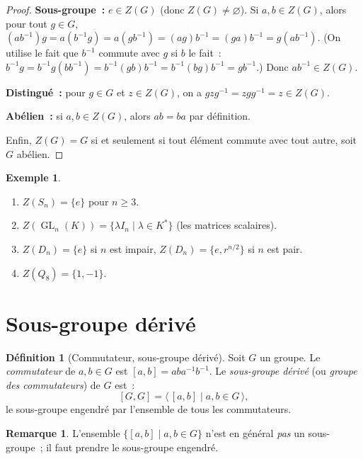 \documentclass[12pt,a4paper,openany]{book}
\theoremstyle{definition}
\newtheorem{definition}{Définition}[chapter]
\newtheorem{remarque}{Remarque}[chapter]
\newtheorem{exemple}{Exemple}[chapter]
\DeclareMathOperator{\GL}{GL}
\newcommand{\gen}[1]{\langle #1 \rangle}
\begin{document}
\begin{proof}
\textbf{Sous-groupe~:} $e \in Z(G)$ (donc $Z(G) \neq \varnothing$). Si $a, b \in Z(G)$,
alors pour tout $g \in G$, $(ab^{-1})g = a(b^{-1}g) = a(gb^{-1}) = (ag)b^{-1} =
(ga)b^{-1} = g(ab^{-1})$. (On utilise le fait que $b^{-1}$ commute avec $g$ si $b$ le
fait~: $b^{-1}g = b^{-1}g(bb^{-1}) = b^{-1}(gb)b^{-1} = b^{-1}(bg)b^{-1} =
gb^{-1}$.) Donc $ab^{-1} \in Z(G)$.

\textbf{Distingué~:} pour $g \in G$ et $z \in Z(G)$, on a $gzg^{-1} = zgg^{-1} = z \in
Z(G)$.

\textbf{Abélien~:} si $a, b \in Z(G)$, alors $ab = ba$ par définition.

Enfin, $Z(G) = G$ si et seulement si tout élément commute avec tout autre, soit $G$
abélien.
\end{proof}

\begin{exemple}
\label{ex:centres}
\begin{enumerate}[label=(\roman*)]
  \item $Z(S_n) = \{e\}$ pour $n \geq 3$.
  \item $Z(\GL_n(K)) = \{\lambda I_n \mid \lambda \in K^*\}$ (les matrices scalaires).
  \item $Z(D_n) = \{e\}$ si $n$ est impair, $Z(D_n) = \{e, r^{n/2}\}$ si $n$ est pair.
  \item $Z(Q_8) = \{1, -1\}$.
\end{enumerate}
\end{exemple}

\section{Sous-groupe dérivé}
\label{sec:ch2-derive}

\begin{definition}[Commutateur, sous-groupe dérivé]
\label{def:derive}
Soit $G$ un groupe. Le \emph{commutateur} de $a, b \in G$ est $[a, b] = aba^{-1}b^{-1}$.
Le \emph{sous-groupe dérivé} (ou \emph{groupe des commutateurs}) de $G$ est~:
\[
  [G, G] = \gen{\, [a,b] \mid a, b \in G \,},
\]
le sous-groupe engendré par l'ensemble de tous les commutateurs.
\end{definition}

\begin{remarque}
L'ensemble $\{[a,b] \mid a, b \in G\}$ n'est en général \emph{pas} un sous-groupe~; il
faut prendre le sous-groupe engendré.
\end{remarque}
\end{document}
